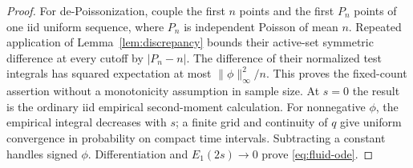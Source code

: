 \documentclass[11pt,letterpaper]{article}
\begin{document}
\begin{proof}
For de-Poissonization, couple the first $n$ points and the first $P_n$
points of one iid uniform sequence, where $P_n$ is independent Poisson
of mean $n$. Repeated application of Lemma~\ref{lem:discrepancy} bounds
their active-set symmetric difference at every cutoff by $|P_n-n|$.
The difference of their normalized test integrals has squared expectation
at most $\|\phi\|_\infty^2/n$. This proves the fixed-count assertion
without a monotonicity assumption in sample size.
At $s=0$ the result is the ordinary iid empirical second-moment calculation.
For nonnegative $\phi$, the empirical integral decreases with $s$;
a finite grid and continuity of $q$ give uniform convergence in probability
on compact time intervals. Subtracting a constant handles signed $\phi$.
Differentiation and $E_1(2s)\to0$ prove \eqref{eq:fluid-ode}.
\end{proof}
\end{document}
